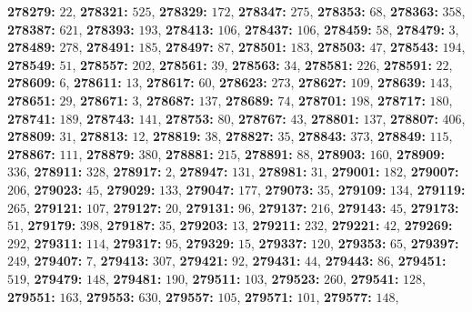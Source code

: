 \textsf{\bfseries 278279:} $22$, \textsf{\bfseries 278321:} $525$, \textsf{\bfseries 278329:} $172$, \textsf{\bfseries 278347:} $275$, \textsf{\bfseries 278353:} $68$, \textsf{\bfseries 278363:} $358$, \textsf{\bfseries 278387:} $621$, \textsf{\bfseries 278393:} $193$, \textsf{\bfseries 278413:} $106$, \textsf{\bfseries 278437:} $106$, \textsf{\bfseries 278459:} $58$, \textsf{\bfseries 278479:} $3$, \textsf{\bfseries 278489:} $278$, \textsf{\bfseries 278491:} $185$, \textsf{\bfseries 278497:} $87$, \textsf{\bfseries 278501:} $183$, \textsf{\bfseries 278503:} $47$, \textsf{\bfseries 278543:} $194$, \textsf{\bfseries 278549:} $51$, \textsf{\bfseries 278557:} $202$, \textsf{\bfseries 278561:} $39$, \textsf{\bfseries 278563:} $34$, \textsf{\bfseries 278581:} $226$, \textsf{\bfseries 278591:} $22$, \textsf{\bfseries 278609:} $6$, \textsf{\bfseries 278611:} $13$, \textsf{\bfseries 278617:} $60$, \textsf{\bfseries 278623:} $273$, \textsf{\bfseries 278627:} $109$, \textsf{\bfseries 278639:} $143$, \textsf{\bfseries 278651:} $29$, \textsf{\bfseries 278671:} $3$, \textsf{\bfseries 278687:} $137$, \textsf{\bfseries 278689:} $74$, \textsf{\bfseries 278701:} $198$, \textsf{\bfseries 278717:} $180$, \textsf{\bfseries 278741:} $189$, \textsf{\bfseries 278743:} $141$, \textsf{\bfseries 278753:} $80$, \textsf{\bfseries 278767:} $43$, \textsf{\bfseries 278801:} $137$, \textsf{\bfseries 278807:} $406$, \textsf{\bfseries 278809:} $31$, \textsf{\bfseries 278813:} $12$, \textsf{\bfseries 278819:} $38$, \textsf{\bfseries 278827:} $35$, \textsf{\bfseries 278843:} $373$, \textsf{\bfseries 278849:} $115$, \textsf{\bfseries 278867:} $111$, \textsf{\bfseries 278879:} $380$, \textsf{\bfseries 278881:} $215$, \textsf{\bfseries 278891:} $88$, \textsf{\bfseries 278903:} $160$, \textsf{\bfseries 278909:} $336$, \textsf{\bfseries 278911:} $328$, \textsf{\bfseries 278917:} $2$, \textsf{\bfseries 278947:} $131$, \textsf{\bfseries 278981:} $31$, \textsf{\bfseries 279001:} $182$, \textsf{\bfseries 279007:} $206$, \textsf{\bfseries 279023:} $45$, \textsf{\bfseries 279029:} $133$, \textsf{\bfseries 279047:} $177$, \textsf{\bfseries 279073:} $35$, \textsf{\bfseries 279109:} $134$, \textsf{\bfseries 279119:} $265$, \textsf{\bfseries 279121:} $107$, \textsf{\bfseries 279127:} $20$, \textsf{\bfseries 279131:} $96$, \textsf{\bfseries 279137:} $216$, \textsf{\bfseries 279143:} $45$, \textsf{\bfseries 279173:} $51$, \textsf{\bfseries 279179:} $398$, \textsf{\bfseries 279187:} $35$, \textsf{\bfseries 279203:} $13$, \textsf{\bfseries 279211:} $232$, \textsf{\bfseries 279221:} $42$, \textsf{\bfseries 279269:} $292$, \textsf{\bfseries 279311:} $114$, \textsf{\bfseries 279317:} $95$, \textsf{\bfseries 279329:} $15$, \textsf{\bfseries 279337:} $120$, \textsf{\bfseries 279353:} $65$, \textsf{\bfseries 279397:} $249$, \textsf{\bfseries 279407:} $7$, \textsf{\bfseries 279413:} $307$, \textsf{\bfseries 279421:} $92$, \textsf{\bfseries 279431:} $44$, \textsf{\bfseries 279443:} $86$, \textsf{\bfseries 279451:} $519$, \textsf{\bfseries 279479:} $148$, \textsf{\bfseries 279481:} $190$, \textsf{\bfseries 279511:} $103$, \textsf{\bfseries 279523:} $260$, \textsf{\bfseries 279541:} $128$, \textsf{\bfseries 279551:} $163$, \textsf{\bfseries 279553:} $630$, \textsf{\bfseries 279557:} $105$, \textsf{\bfseries 279571:} $101$, \textsf{\bfseries 279577:} $148$, 
